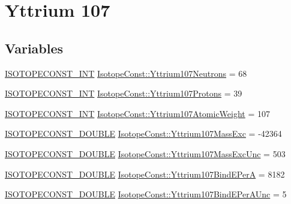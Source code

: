 \hypertarget{group___isotope_const-_yttrium-_y107}{}\section{Yttrium 107}
\label{group___isotope_const-_yttrium-_y107}
\subsection*{Variables}
\begin{DoxyCompactItemize}
\item 
\mbox{\hyperlink{group___isotope_const-_macros_ga5f18360b3e99483a35c32d789e62621c}{I\+S\+O\+T\+O\+P\+E\+C\+O\+N\+S\+T\+\_\+\+I\+NT}} \mbox{\hyperlink{group___isotope_const-_yttrium-_y107_ga3327d6d236281c4fe80064dc44337da6}{Isotope\+Const\+::\+Yttrium107\+Neutrons}} = 68
\item 
\mbox{\hyperlink{group___isotope_const-_macros_ga5f18360b3e99483a35c32d789e62621c}{I\+S\+O\+T\+O\+P\+E\+C\+O\+N\+S\+T\+\_\+\+I\+NT}} \mbox{\hyperlink{group___isotope_const-_yttrium-_y107_gafebbca1a04736d147dda77f2d01f4eda}{Isotope\+Const\+::\+Yttrium107\+Protons}} = 39
\item 
\mbox{\hyperlink{group___isotope_const-_macros_ga5f18360b3e99483a35c32d789e62621c}{I\+S\+O\+T\+O\+P\+E\+C\+O\+N\+S\+T\+\_\+\+I\+NT}} \mbox{\hyperlink{group___isotope_const-_yttrium-_y107_ga45687d8e4e1bbdc3989a8a6e6c5228a4}{Isotope\+Const\+::\+Yttrium107\+Atomic\+Weight}} = 107
\item 
\mbox{\hyperlink{group___isotope_const-_macros_ga8f45a7272ce02c0b4c65c44636ed719a}{I\+S\+O\+T\+O\+P\+E\+C\+O\+N\+S\+T\+\_\+\+D\+O\+U\+B\+LE}} \mbox{\hyperlink{group___isotope_const-_yttrium-_y107_ga47d23126f216f3fedcbe34369130e5c6}{Isotope\+Const\+::\+Yttrium107\+Mass\+Exc}} = -\/42364
\item 
\mbox{\hyperlink{group___isotope_const-_macros_ga8f45a7272ce02c0b4c65c44636ed719a}{I\+S\+O\+T\+O\+P\+E\+C\+O\+N\+S\+T\+\_\+\+D\+O\+U\+B\+LE}} \mbox{\hyperlink{group___isotope_const-_yttrium-_y107_ga2d7bd453333f4eda33a3d736b8c5a3de}{Isotope\+Const\+::\+Yttrium107\+Mass\+Exc\+Unc}} = 503
\item 
\mbox{\hyperlink{group___isotope_const-_macros_ga8f45a7272ce02c0b4c65c44636ed719a}{I\+S\+O\+T\+O\+P\+E\+C\+O\+N\+S\+T\+\_\+\+D\+O\+U\+B\+LE}} \mbox{\hyperlink{group___isotope_const-_yttrium-_y107_gae1e8f669f187f6125959b0d0ff9fc757}{Isotope\+Const\+::\+Yttrium107\+Bind\+E\+PerA}} = 8182
\item 
\mbox{\hyperlink{group___isotope_const-_macros_ga8f45a7272ce02c0b4c65c44636ed719a}{I\+S\+O\+T\+O\+P\+E\+C\+O\+N\+S\+T\+\_\+\+D\+O\+U\+B\+LE}} \mbox{\hyperlink{group___isotope_const-_yttrium-_y107_ga978a900fd6ddd4ab30acffa95b674445}{Isotope\+Const\+::\+Yttrium107\+Bind\+E\+Per\+A\+Unc}} = 5

\end{DoxyCompactItemize}

